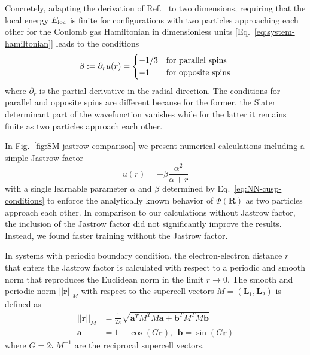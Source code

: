 \documentclass[
 reprint,
 amsmath,amssymb,
 aps, prx,
floatfix,longbibliography,
]{revtex4-2}
\begin{document}
\begin{appendix}
Concretely, adapting the derivation of Ref.~\cite{Foulkes2001Jan} to two dimensions, requiring that the local energy $E_{\rm loc}$ is finite for configurations with two particles approaching each other for the Coulomb gas Hamiltonian in dimensionless units [Eq.~\eqref{eq:system-hamiltonian}] leads to the conditions \cite{Teng2024Nov}
\begin{equation}
    \beta := \partial_r u(r) = \begin{cases}
        -1/3 & {\rm for\ parallel\  spins} \\
        -1 & {\rm for\ opposite\  spins} 
    \end{cases}
    \label{eq:NN-cusp-conditions}
\end{equation}
where $\partial_r$ is the partial derivative in the radial direction. The conditions for parallel and opposite spins are different because for the former, the Slater determinant part of the wavefunction vanishes while for the latter it remains finite as two particles approach each other. 

In Fig.~\ref{fig:SM-jastrow-comparison} we present numerical calculations including a simple Jastrow factor
\begin{equation}
    u(r) = - \beta \frac{\alpha^2}{\alpha + r}
    \label{eq:NN-cusp-u(r)}
\end{equation}
with a single learnable parameter $\alpha$ and $\beta$ determined by Eq.~\eqref{eq:NN-cusp-conditions} to enforce the analytically known behavior of $\Psi(\bm R)$ as two particles approach each other. 
In comparison to our calculations without Jastrow factor, the inclusion of the Jastrow factor did not significantly improve the results. Instead, we found faster training without the Jastrow factor.



In systems with periodic boundary condition, the electron-electron distance $r$ that enters the Jastrow factor is calculated with respect to a periodic and smooth norm that reproduces the Euclidean norm in the limit $r \to 0$. The smooth and periodic norm $||\bm r||_{M}$ with respect to the supercell vectors $M = (\bm L_1, \bm L_2)$ is defined as \cite{Cassella2023Jan}
\begin{align}
    ||\bm r||_{M} & = \frac{1}{2 \pi} \sqrt{\bm a^T M^T M\bm a + \bm b^T M^T M\bm b} \label{eq:NN-attn-jastrow-periodicnorm} \\
    \bm a & = 1 - \cos (G \bm r), \ \ \bm b  = \sin (G \bm r) \nonumber
\end{align}
where $G = 2\pi M^{-1}$ are the reciprocal supercell vectors. 



\end{appendix}
\end{document}
